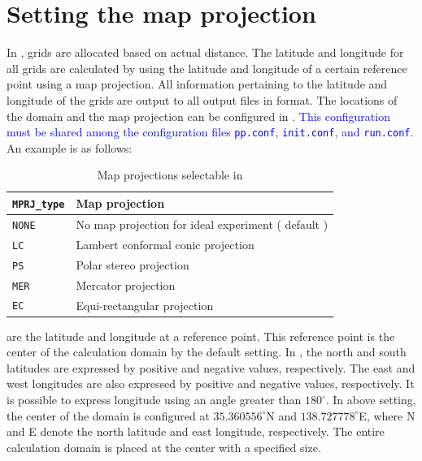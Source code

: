 \section{Setting the map projection} \label{subsec:adv_mapproj}

In \scalerm, grids are allocated based on actual distance. The latitude and longitude for all grids are calculated by using the latitude and longitude of a certain reference point using a map projection. All information pertaining to the latitude and longitude of the grids are output to all output files in \netcdf format. The locations of the domain and the map projection can be configured in . \textcolor{blue}{This configuration must be shared among the configuration files \texttt{pp.conf}, \texttt{init.conf}, and \texttt{run.conf}.} An example is as follows:

\begin{table}[tb]
\begin{center}
\caption{Map projections selectable in \scalerm}
\begin{tabularx}{150mm}{|l|X|} \hline
 \rowcolor[gray]{0.9} \verb|MPRJ_type| & Map projection\\ \hline
 \verb|NONE| & No map projection for ideal experiment ( default ) \\ \hline
 \verb|LC|   & Lambert conformal conic projection   \\ \hline
 \verb|PS|   & Polar stereo projection           \\ \hline
 \verb|MER|  & Mercator projection               \\ \hline
 \verb|EC|   & Equi-rectangular projection        \\ \hline
\end{tabularx}
\label{tab:map_proj}
\end{center}
\end{table}

 are the latitude and longitude at a reference point. This reference point is the center of the calculation domain by the default setting.
In \scalerm, the north and south latitudes are expressed by positive and negative values, respectively. The east and west longitudes are also expressed by positive and negative values, respectively. It is possible to express longitude using an angle greater than $180^{\circ}$.
In above setting, the center of the domain is configured at $35.360556^{\circ}$N and $138.727778^{\circ}$E, where N and E denote the north latitude and east longitude, respectively. The entire calculation domain is placed at the center with a specified size.

